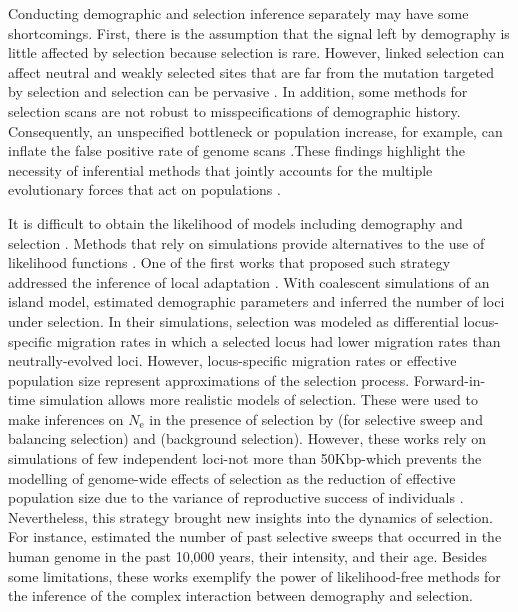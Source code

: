 \documentclass[a4paper, 12pt]{article}
\begin{document}
Conducting demographic and selection inference separately may have some shortcomings. First, there is the assumption that the signal left by demography is little affected by selection because selection is rare. However, linked selection can affect neutral and weakly selected sites that are far from the mutation targeted by selection \citep{Sella:2009hs, Neher:2013ju} and selection can be pervasive \citep{Sella:2009hs, Lange:2018fl}. In addition, some methods for selection scans are not robust to misspecifications of demographic history. Consequently, an unspecified bottleneck or population increase, for example, can inflate the false positive rate of genome scans \citep{Jensen:2005ky, Jensen:2007jw, Schrider:2016gg}.These findings highlight the necessity of inferential methods that jointly accounts for the multiple evolutionary forces that act on populations \citep{Lin:2011jv, Li:2012bh, Bank:2014hx}. 
 
It is difficult to obtain the likelihood of models including demography and selection \citep[but see][]{Vitalis:2014ja}. Methods that rely on simulations provide alternatives to the use of likelihood functions \citep{Csillery:2010jd, Schrider:2018ei}. One of the first works that proposed such strategy addressed the inference of local adaptation \citep{Bazin:2010dv}. With coalescent simulations of an island model, \citet{Bazin:2010dv} estimated demographic parameters and inferred the number of loci under selection. In their simulations, selection was modeled as differential locus-specific migration rates in which a selected locus had lower migration rates than neutrally-evolved loci. However, locus-specific migration rates or effective population size \citep[as in][]{Roux:2016gm, Fraisse:2021gg} represent approximations of the selection process. Forward-in-time simulation allows more realistic models of selection. These were used to make inferences on $N_\mathrm{e}$ in the presence of selection by \citet{Sheehan:2016caa} (for selective sweep and balancing selection) and \citet{Johri:2020ee} (background selection). However, these works rely on simulations of few independent loci-not more than 50Kbp-which prevents the modelling of genome-wide effects of selection as the reduction of effective population size due to the variance of reproductive success of individuals \citep[e.g.][]{Santiago:1995wx}. Nevertheless, this strategy brought new insights into the dynamics of selection. For instance, \citet{Laval:2019jo} estimated the number of past selective sweeps that occurred in the human genome in the past 10,000 years, their intensity, and their age. Besides some limitations, these works exemplify the power of likelihood-free methods for the inference of the complex interaction between demography and selection.
\end{document}
